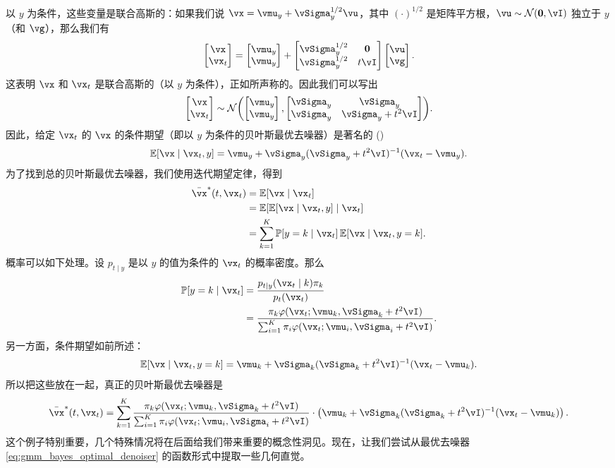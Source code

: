 \documentclass[../../book-main_zh.tex]{subfiles}
\begin{document}
\begin{example}[从高斯混合模型中去噪高斯噪声]
	以 \(y\) 为条件，这些变量是联合高斯的：如果我们说 \(\vx = \vmu_{y} + \vSigma_{y}^{1/2}\vu\)，其中 \((\cdot)^{1/2}\) 是矩阵平方根，\(\vu \sim \dNorm(\vzero, \vI)\) 独立于 \(y\)（和 \(\vg\)），那么我们有
	\begin{equation}
		\mat{\vx \\ \vx_{t}} = \mat{\vmu_{y} \\ \vmu_{y}} + \mat{\vSigma_{y}^{1/2} & \vzero \\ \vSigma_{y}^{1/2} & t\vI}\mat{\vu \\ \vg}.
	\end{equation}
	这表明 \(\vx\) 和 \(\vx_{t}\) 是联合高斯的（以 \(y\) 为条件），正如所声称的。因此我们可以写出
	\begin{equation}
		\mat{\vx \\ \vx_{t}} \sim \dNorm\rp{\mat{\vmu_{y} \\ \vmu_{y}}, \mat{\vSigma_{y} & \vSigma_{y} \\ \vSigma_{y} & \vSigma_{y} + t^{2}\vI}}.
	\end{equation}
	因此，给定 \(\vx_{t}\) 的 \(\vx\) 的条件期望（即以 \(y\) 为条件的贝叶斯最优去噪器）是著名的
	()
	\begin{equation}
		\Ex[\vx \mid \vx_{t}, y] = \vmu_{y} + \vSigma_{y}(\vSigma_{y} + t^{2}\vI)^{-1}(\vx_{t} - \vmu_{y}).
	\end{equation}
	为了找到总的贝叶斯最优去噪器，我们使用迭代期望定律，得到
	\begin{align}
		\bar{\vx}^{\ast}(t, \vx_{t})
		&= \Ex[\vx \mid \vx_{t}] \\ 
		&= \Ex[\Ex[\vx \mid \vx_{t}, y] \mid \vx_{t}] \\ 
		&= \sum_{k = 1}^{K}\Pr[y = k \mid \vx_{t}]\Ex[\vx \mid \vx_{t}, y = k].
	\end{align}
	概率可以如下处理。设 \(p_{t \mid y}\) 是以 \(y\) 的值为条件的 \(\vx_{t}\) 的概率密度。那么
	\begin{align}
		\Pr[y = k \mid \vx_{t}]
		&= \frac{p_{t \mid y}(\vx_{t} \mid k)\pi_{k}}{p_{t}(\vx_{t})} \\ 
		&= \frac{\pi_{k}\phi(\vx_{t} ; \vmu_{k}, \vSigma_{k}
		+ t^{2}\vI)}{\sum_{i = 1}^{K}\pi_{i}\phi(\vx_{t} ; \vmu_{i}, \vSigma_{i} + t^{2}\vI)}.
	\end{align}
	另一方面，条件期望如前所述：
	\begin{equation}
		\Ex[\vx \mid \vx_{t}, y = k] = \vmu_{k} + \vSigma_{k}(\vSigma_{k} + t^{2}\vI)^{-1}(\vx_{t} - \vmu_{k}).
	\end{equation}
	所以把这些放在一起，真正的贝叶斯最优去噪器是
	\begin{equation}\label{eq:gmm_bayes_optimal_denoiser}
		\bar{\vx}^{\ast}(t, \vx_{t}) = \sum_{k = 1}^{K}\frac{\pi_{k}\phi(\vx_{t}
		;\vmu_{k}, \vSigma_{k} + t^{2}\vI)}{\sum_{i = 1}^{K}\pi_{i}\phi(\vx_{t}
		;\vmu_{i}, \vSigma_{i} + t^{2}\vI)}\cdot\bp{\vmu_{k} + \vSigma_{k}(\vSigma_{k} + t^{2}\vI)^{-1}(\vx_{t} - \vmu_{k})}.
	\end{equation}
	这个例子特别重要，几个特殊情况将在后面给我们带来重要的概念性洞见。现在，让我们尝试从最优去噪器 \eqref{eq:gmm_bayes_optimal_denoiser} 的函数形式中提取一些几何直觉。


\end{example}
\end{document}
